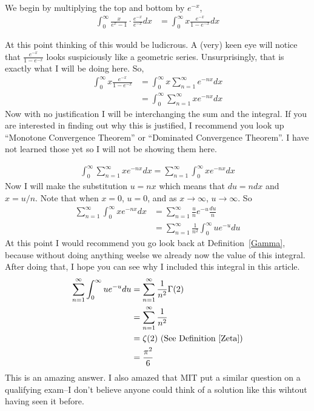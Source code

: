 \documentclass[12pt]{article}
\theoremstyle{definition}
\theoremstyle{remark}
\newcommand{\indef}{\int_{0}^{\infty}}
\begin{document}
    We begin by multiplying the top and bottom by $e^{-x}$, 
    \begin{align*}
        \indef \frac{x}{e^x-1}\cdot \frac{e^{-x}}{e^{-x}}dx &= \indef x\frac{e^{-x}}{1-e^{-x}}dx
    \end{align*}

    At this point thinking of this would be ludicrous.
    A (very) keen eye will notice that $\frac{e^{-x}}{1-e^{-x}}$ looks suspiciously like a geometric series.
    Unsurprisingly, that is exactly what I will be doing here. So,
    \begin{align*}
        \indef x\frac{e^{-x}}{1-e^{-x}} &= \indef x\sum_{n=1}^{\infty} e^{-nx}dx \\ 
        &= \indef \sum_{n=1}^{\infty} xe^{-nx}dx
    \end{align*}
    Now with no justification I will be interchanging the sum and the integral. 
    If you are interested in finding out why this is justified, I recommend you look up ``Monotone Convergence Theorem'' or ``Dominated Convergence Theorem''.
    I have not learned those yet so I will not be showing them here.
    
    \begin{align*}
        \indef \sum_{n=1}^{\infty} xe^{-nx}dx = \sum_{n=1}^{\infty} \indef xe^{-nx}dx
    \end{align*}
    Now I will make the substitution $u = nx$ which means that $du = ndx$ and $x = u/n$. 
    Note that when $x = 0$, $u = 0$, and as $x \to \infty$, $u \to \infty$. So 
    \begin{align*}
        \sum_{n=1}^{\infty} \indef xe^{-nx}dx &= \sum_{n=1}^{\infty} \frac{u}{n}e^{-u}\frac{du}{n} \\ 
        &= \sum_{n=1}^{\infty} \frac{1}{n^2} \indef ue^{-u}du
    \end{align*}
    At this point I would recommend you go look back at Definition~\ref{Gamma}, because without doing anything weelse we already now the value of this integral.
    After doing that, I hope you can see why I included this integral in this article.
    \begin{align*}
        \sum_{n=1}^{\infty} \indef ue^{-u}du &= \sum_{n=1}^{\infty} \frac{1}{n^2} \Gamma(2) \\ 
        &= \sum_{n=1}^{\infty} \frac{1}{n^2} \\ 
        &= \zeta(2) \text{ (See Definition~\ref{Zeta})} \\ 
        &= \frac{\pi^2}{6}
    \end{align*}
    This is an amazing answer. I also amazed that MIT put a similar question on a qualifying exam--I don't believe anyone could think of a solution like this wihtout having seen it before.
\end{document}
